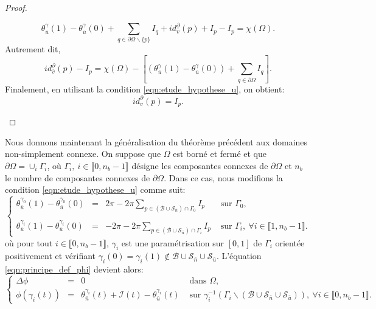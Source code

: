 \begin{proof}
\begin{itemize}
        $$
        \theta_{\bar{u}}^\gamma(1)-\theta_{\bar{u}}^\gamma(0)+\sum_{q\in\partial\Omega\backslash\{p\}}I_q + id^\partial_{\bar{v}}(p) + I_p - I_p =\chi(\Omega).
        $$
        Autrement dit,
        $$
        id^\partial_{\bar{v}}(p) - I_p =\chi(\Omega)-\left[\left(\theta_{\bar{u}}^\gamma(1)-\theta_{\bar{u}}^\gamma(0)\right)+\sum_{q\in\partial\Omega} I_q\right].
        $$
        Finalement, en utilisant la condition \eqref{eqn:etude_hypothese_u}, on obtient:
        $$
        id^\partial_v(p)=I_p.
        $$
    \end{itemize}
\end{proof}

Nous donnons maintenant la généralisation du théorème précédent aux domaines non-simplement connexe. On suppose que $\Omega$ est borné et fermé et que $\partial\Omega=\cup_i\Gamma_i$, où $\Gamma_i,~i\in\llbracket 0, n_b-1\rrbracket$ désigne les composantes connexes de $\partial\Omega$ et $n_b$ le nombre de composantes connexes de $\partial\Omega$. Dans ce cas, nous modifions la condition \eqref{eqn:etude_hypothese_u} comme suit:
\begin{equation}
    \left\{
    \begin{array}{lcll}
    \theta_{\bar{u}}^{\gamma_0}(1)-\theta_{\bar{u}}^{\gamma_0}(0)&=&2\pi-2\pi\displaystyle\sum_{p\in(\mathcal{B}\cup\mathcal{S}_{\bar{n}})\cap\Gamma_0}I_p&\mbox{ sur }\Gamma_0,\\\\
    \theta_{\bar{u}}^{\gamma_i}(1)-\theta_{\bar{u}}^{\gamma_i}(0)&=&-2\pi-2\pi\displaystyle\sum_{p\in(\mathcal{B}\cup\mathcal{S}_{\bar{n}})\cap\Gamma_i}I_p&\mbox{ sur }\Gamma_i,~\forall i\in\llbracket 1, n_b-1\rrbracket.
    \end{array}
    \right.
    \label{eqn:etude_hypothese_u_second}
\end{equation}
où pour tout $i\in\llbracket0, n_b-1\rrbracket$, $\gamma_i$ est une paramétrisation sur $[0, 1]$ de $\Gamma_i$ orientée positivement et vérifiant $\gamma_i(0)=\gamma_i(1)\notin\mathcal{B}\cup\mathcal{S}_{\bar{n}}\cup\mathcal{S}_{\bar{u}}$. L'équation \eqref{eqn:principe_def_phi} devient alors:
\begin{equation}
\left\{
\begin{array}{lcll}
\Delta\phi &=& 0 &\mbox{ dans }\Omega,\\[0.5cm]
\phi(\gamma_i(t))&=&\theta_{\bar{n}}^{\gamma_i}(t)+\mathcal{I}(t)-\theta_{\bar{u}}^{\gamma_i}(t) & \mbox{ sur } \gamma_i^{-1}(\Gamma_i\backslash(\mathcal{B}\cup\mathcal{S}_{\bar{n}}\cup\mathcal{S}_{\bar{u}})),~\forall i\in\llbracket 0, n_b-1\rrbracket.
\end{array}
\right.
\label{eqn:etude_def_phi_second}
\end{equation}
